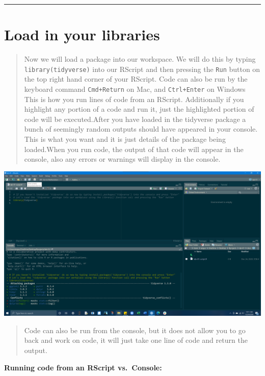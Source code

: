 \documentclass[
]{article}
\begin{document}
\begin{center}\rule{0.5\linewidth}{0.5pt}\end{center}

\hypertarget{load-in-your-libraries}{%
\section{\texorpdfstring{\textbf{Load in your
libraries}}{Load in your libraries}}\label{load-in-your-libraries}}

\begin{quote}
Now we will load a package into our workspace. We will do this by typing
\texttt{library(tidyverse)} into our RScript and then pressing the
\texttt{Run} button on the top right hand corner of your RScript. Code
can also be run by the keyboard command \texttt{Cmd+Return} on Mac, and
\texttt{Ctrl+Enter} on Windows This is how you run lines of code from an
RScript. Additionally if you highlight any portion of a code and run it,
just the highlighted portion of code will be executed.After you have
loaded in the tidyverse package a bunch of seemingly random outputs
should have appeared in your console. This is what you want and it is
just details of the package being loaded.When you run code, the output
of that code will appear in the console, also any errors or warnings
will display in the console.
\end{quote}

\includegraphics{img/load-lib-save.png}

\begin{quote}
Code can also be run from the console, but it does not allow you to go
back and work on code, it will just take one line of code and return the
output.
\end{quote}

\textbf{Running code from an RScript vs.~Console:}
\end{document}
